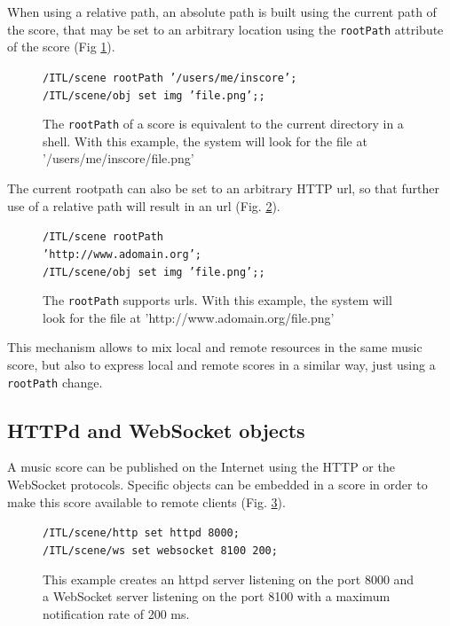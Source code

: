 \documentclass[11pt,a4paper]{article}
\newcommand{\OSC}[1]	{{\fontsize{10pt}{10pt} \selectfont\texttt{#1}}}
\newcommand{\tab}		{\hspace*{4mm}}
\newcommand{\dtab}		{\tab \tab}
\newcommand{\sample}[1]	{\vspace{-0.2em}\begin{center}\colorbox{mygrey}{\begin{minipage}[t]{0.98\columnwidth} {\small \texttt{#1}}\end{minipage}}\end{center}}
\begin{document}
When using a relative path, an absolute path is built using the current path of the score, that may be set to an arbitrary location using the \OSC{rootPath} attribute of the score (Fig \ref{fig:rootpath}). 

\begin{figure}[ht]
\begin{center}
\sample{/ITL/scene rootPath '/users/me/inscore';\\
/ITL/scene/obj set img 'file.png';;
}
\caption{The \OSC{rootPath} of a score is equivalent to the current directory in a shell. With this example, the system will look for the file at '/users/me/inscore/file.png'}
\label{fig:rootpath}
\end{center}
\end{figure}

The current rootpath can also be set to an arbitrary HTTP url, so that further use of a relative path will result in an url (Fig. \ref{fig:rooturl}).

\begin{figure}[ht]
\begin{center}
\sample{/ITL/scene rootPath \\
\dtab \dtab \dtab 'http://www.adomain.org';\\
/ITL/scene/obj set img 'file.png';;
}
\caption{The \OSC{rootPath} supports urls. With this example, the system will look for the file at 'http://www.adomain.org/file.png'}
\label{fig:rooturl}
\end{center}
\end{figure}

This mechanism allows to mix local and remote resources in the same music score, but also to express local and remote scores in a similar way, just using a \OSC{rootPath} change.


\subsection{HTTPd and WebSocket objects}

A music score can be published on the Internet using the HTTP or the WebSocket protocols. Specific objects can be embedded in a score in order to make this score available to remote clients (Fig. \ref{fig:servers}).

\begin{figure}[ht]
\begin{center}
\sample{/ITL/scene/http set httpd 8000; \\
  /ITL/scene/ws set websocket 8100 200;
}
\caption{This example creates an httpd server listening on the port 8000 and a WebSocket server listening on the port 8100 with a  maximum notification rate of 200 ms.}
\label{fig:servers}
\end{center}
\end{figure}
\end{document}
